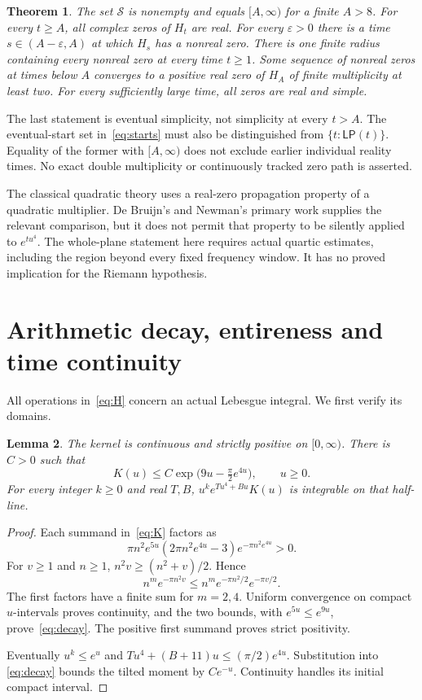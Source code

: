 \documentclass[11pt]{article}
\newtheorem{theorem}{Theorem}[section]
\newtheorem{lemma}[theorem]{Lemma}
\theoremstyle{remark}\newtheorem{remark}[theorem]{Remark}
\begin{document}
\begin{theorem}\label{thm:main}
The set $\mathcal S$ is nonempty and equals $[A,\infty)$ for a
finite $A>8$. For every $t\geq A$, all complex zeros of $H_t$
are real. For every $\varepsilon>0$ there is a time
$s\in(A-\varepsilon,A)$ at which $H_s$ has a nonreal zero.
There is one finite radius containing every nonreal zero at
every time $t\geq1$. Some sequence of nonreal zeros at times
below $A$ converges to a positive real zero of $H_A$ of finite
multiplicity at least two. For every sufficiently large time,
all zeros are real and simple.
\end{theorem}

The last statement is eventual simplicity, not simplicity at
every $t>A$. The eventual-start set in~\eqref{eq:starts} must
also be distinguished from $\{t:\mathsf{LP}(t)\}$. Equality
of the former with $[A,\infty)$ does not exclude earlier
individual reality times. No exact double multiplicity or
continuously tracked zero path is asserted.

The classical quadratic theory uses a real-zero propagation
property of a quadratic multiplier. De Bruijn's and Newman's
primary work supplies the relevant comparison, but it does not
permit that property to be silently applied to $e^{tu^4}$.
The whole-plane statement here requires actual quartic
estimates, including the region beyond every fixed frequency
window. It has no proved implication for the Riemann hypothesis.

\section{Arithmetic decay, entireness and time continuity}
All operations in~\eqref{eq:H} concern an actual Lebesgue
integral. We first verify its domains.

\begin{lemma}\label{lem:kernel}
The kernel is continuous and strictly positive on $[0,\infty)$.
There is $C>0$ such that
\begin{equation}\label{eq:decay}
 K(u)\leq C\exp\bigl(9u-\tfrac\pi2e^{4u}\bigr),\qquad u\geq0.
\end{equation}
For every integer $k\geq0$ and real $T,B$,
$u^ke^{Tu^4+Bu}K(u)$ is integrable on that half-line.
\end{lemma}
\begin{proof}
Each summand in~\eqref{eq:K} factors as
\[
 \pi n^2e^{5u}(2\pi n^2e^{4u}-3)e^{-\pi n^2e^{4u}}>0.
\]
For $v\geq1$ and $n\geq1$, $n^2v\geq(n^2+v)/2$. Hence
\[
 n^me^{-\pi n^2v}\leq n^me^{-\pi n^2/2}e^{-\pi v/2}.
\]
The first factors have a finite sum for $m=2,4$. Uniform
convergence on compact $u$-intervals proves continuity, and
the two bounds, with $e^{5u}\leq e^{9u}$, prove~\eqref{eq:decay}.
The positive first summand proves strict positivity.

Eventually $u^k\leq e^u$ and
$Tu^4+(B+11)u\leq(\pi/2)e^{4u}$. Substitution into
\eqref{eq:decay} bounds the tilted moment by $Ce^{-u}$.
Continuity handles its initial compact interval.
\end{proof}
\end{document}
